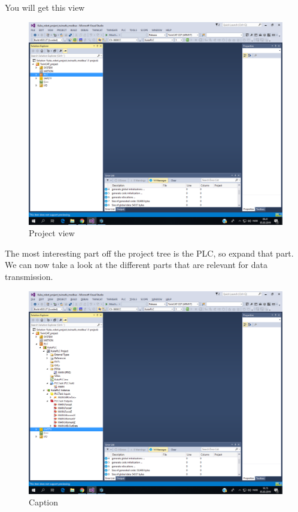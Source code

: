 \documentclass{article}
\begin{document}
\newpage
You will get this view

\begin{figure}[!h]
    \centering
    \includegraphics[width=\textwidth]{pictures/TC3_overview/TC3_project_view.png}
    \caption{Project view}
    \label{fig:my_label2}
\end{figure}

The most interesting part off the project tree is the PLC, so expand that part. 
\newpage
We can now take a look at the different parts that are relevant for data transmission.

\begin{figure}[!h]
    \centering
    \includegraphics[width=\textwidth]{pictures/TC3_overview/TC3_PLC_expanded.png}
    \caption{Caption}
    \label{fig:my_label}
\end{figure}
\end{document}
